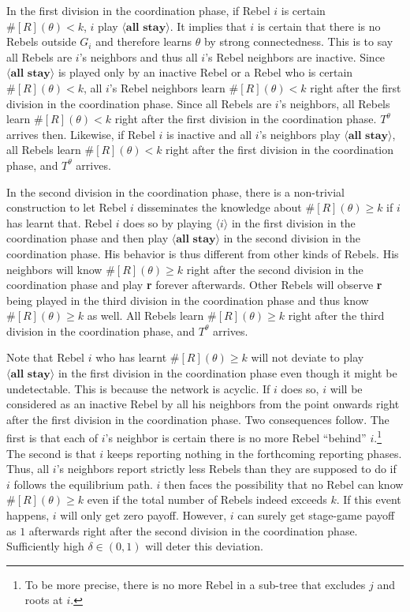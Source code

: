 \documentclass[12pt,letter]{article}
\theoremstyle{definition}
\theoremstyle{definition}
\theoremstyle{remark}
\theoremstyle{claim}
\begin{document}
In the first division in the coordination phase, if Rebel $i$ is certain $\#[R](\theta)<k$, $i$ play $\langle \textbf{all stay} \rangle$. It implies that $i$ is certain that there is no Rebels outside $G_i$ and therefore learns $\theta$ by strong connectedness. This is to say all Rebels are $i$'s neighbors and thus all $i$'s Rebel neighbors are inactive. Since $\langle \textbf{all stay} \rangle$ is played only by an inactive Rebel or a Rebel who is certain $\#[R](\theta)<k$, all $i$'s Rebel neighbors learn $\#[R](\theta)<k$ right after the first division in the coordination phase. Since all Rebels are $i$'s neighbors, all Rebels learn $\#[R](\theta)<k$ right after the first division in the coordination phase. $T^{\theta}$ arrives then. Likewise, if Rebel $i$ is inactive and all $i$'s neighbors play $\langle \textbf{all stay} \rangle$, all Rebels learn $\#[R](\theta)<k$ right after the first division in the coordination phase, and $T^{\theta}$ arrives.    

In the second division in the coordination phase, there is a non-trivial construction to let Rebel $i$ disseminates the knowledge about $\#[R](\theta)\geq k$ if $i$ has learnt that. Rebel $i$ does so by playing $\langle i \rangle$ in the first division in the coordination phase and then play $\langle \textbf{all stay} \rangle$ in the second division in the coordination phase. His behavior is thus different from other kinds of Rebels. His neighbors will know $\#[R](\theta)\geq k$ right after the second division in the coordination phase and play \textbf{r} forever afterwards. Other Rebels will observe \textbf{r} being played in the third division in the coordination phase and thus know $\#[R](\theta)\geq k$ as well. All Rebels learn $\#[R](\theta)\geq k$ right after the third division in the coordination phase, and $T^{\theta}$ arrives.

Note that Rebel $i$ who has learnt $\#[R](\theta)\geq k$ will not deviate to play $\langle \textbf{all stay} \rangle$ in the first division in the coordination phase even though it might be undetectable. This is because the network is acyclic. If $i$ does so, $i$ will be considered as an inactive Rebel by all his neighbors from the point onwards right after the first division in the coordination phase. Two consequences follow. The first is that each of $i$'s neighbor is certain there is no more Rebel ``behind'' $i$.\footnote{To be more precise, there is no more Rebel in a sub-tree that excludes $j$ and roots at $i$.} 
The second is that $i$ keeps reporting nothing in the forthcoming reporting phases. Thus, all $i$'s neighbors report strictly less Rebels than they are supposed to do if $i$ follows the equilibrium path. $i$ then faces the possibility that no Rebel can know $\#[R](\theta)\geq k$ even if the total number of Rebels indeed exceeds $k$. If this event happens, $i$ will only get zero payoff. However, $i$ can surely get stage-game payoff as $1$ afterwards right after the second division in the coordination phase. Sufficiently high $\delta\in(0,1)$ will deter this deviation. 
\end{document}
